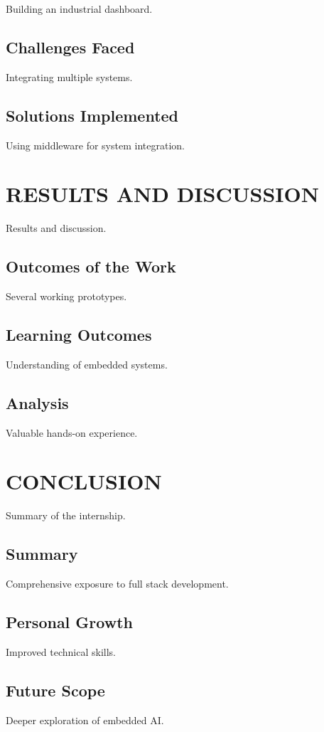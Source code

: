 \documentclass[12pt,a4paper]{report}
\begin{document}
Building an industrial dashboard.




\section{Challenges Faced}

Integrating multiple systems.


\section{Solutions Implemented}

Using middleware for system integration.


\chapter{RESULTS AND DISCUSSION}
\label{ch:results}


Results and discussion.




\section{Outcomes of the Work}

Several working prototypes.


\section{Learning Outcomes}

Understanding of embedded systems.


\section{Analysis}

Valuable hands-on experience.




\chapter{CONCLUSION}
\label{ch:conclusion}


Summary of the internship.




\section{Summary}

Comprehensive exposure to full stack development.


\section{Personal Growth}

Improved technical skills.


\section{Future Scope}

Deeper exploration of embedded AI.
\end{document}
